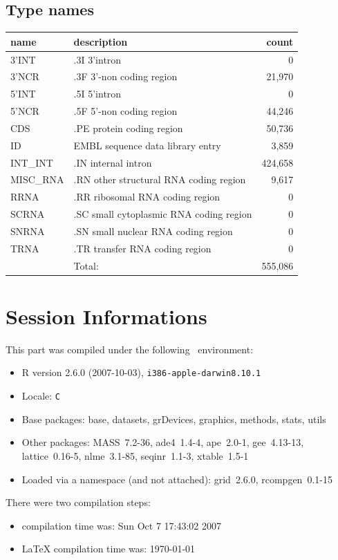 \documentclass{article}
\begin{document}
\begin{Schunk}
\subsection{Type names}
\noindent\begin{tabular}{llr}
\hline \hline
name & description & count \\
\hline
3'INT  &  .3I 3'intron  &  0 \\
3'NCR  &  .3F  3'-non coding region  &  21,970 \\
5'INT  &  .5I 5'intron  &  0 \\
5'NCR  &  .5F  5'-non coding region  &  44,246 \\
CDS  &  .PE protein coding region  &  50,736 \\
ID  &  EMBL sequence data library entry  &  3,859 \\
INT\_INT  &  .IN  internal intron  &  424,658 \\
MISC\_RNA  &  .RN other structural RNA coding region  &  9,617 \\
RRNA  &  .RR ribosomal RNA coding region  &  0 \\
SCRNA  &  .SC small cytoplasmic RNA coding region  &  0 \\
SNRNA  &  .SN small nuclear RNA coding region  &  0 \\
TRNA  &  .TR transfer RNA coding region  &  0 \\
\hline
 & Total: & 555,086 \\
\hline \hline
\end{tabular}\end{Schunk}


\section{Session Informations}

This part was compiled under the following \Rlogo{}~environment:

\begin{itemize}
  \item R version 2.6.0 (2007-10-03), \verb|i386-apple-darwin8.10.1|
  \item Locale: \verb|C|
  \item Base packages: base, datasets, grDevices, graphics, methods,
    stats, utils
  \item Other packages: MASS~7.2-36, ade4~1.4-4, ape~2.0-1,
    gee~4.13-13, lattice~0.16-5, nlme~3.1-85, seqinr~1.1-3,
    xtable~1.5-1
  \item Loaded via a namespace (and not attached): grid~2.6.0,
    rcompgen~0.1-15
\end{itemize}
There were two compilation steps:

\begin{itemize}
  \item \Rlogo{} compilation time was: Sun Oct  7 17:43:02 2007
  \item \LaTeX{} compilation time was: \today
\end{itemize}


\clearpage
{}


\end{document}
